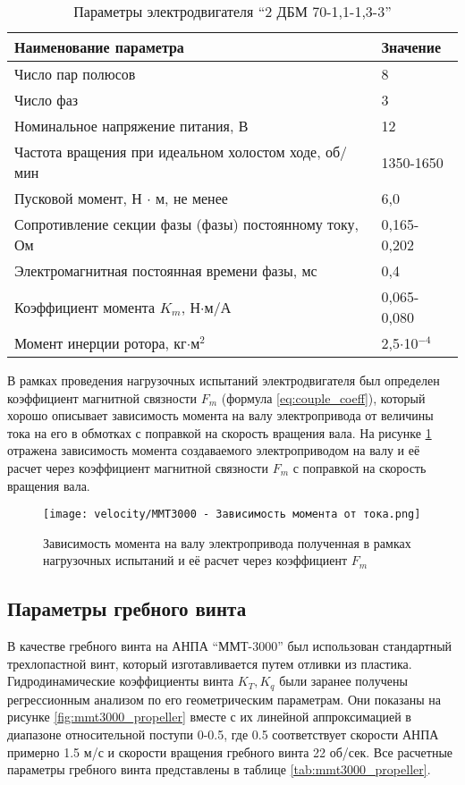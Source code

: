 \begin{table}
    \caption{Параметры электродвигателя ``2 ДБМ 70-1,1-1,3-3'' }\label{tab:mmt300_motor}
    \centering
    \begin{tabular}{ll}
        \toprule
        Наименование параметра  & Значение\\
        \midrule
        Число пар полюсов & 8 \\
        Число фаз & 3 \\
        Номинальное напряжение питания, В   & 12 \\
        Частота вращения при идеальном холостом ходе, об/мин & 1350-1650 \\
        Пусковой момент, Н $\cdot$ м, не менее      & 6,0 \\
        Сопротивление секции фазы (фазы) постоянному току, Ом & 0,165-0,202 \\
        Электромагнитная постоянная времени фазы, мс & 0,4 \\
        Коэффициент момента $K_m$, Н$\cdot$м/А   & 0,065-0,080   \\
        Момент инерции ротора, кг$\cdot$м$^2$   & 2,5$\cdot$10$^{-4}$ \\
        \bottomrule
    \end{tabular}
\end{table}

В рамках проведения нагрузочных испытаний электродвигателя был определен коэффициент магнитной связности $F_m$ (формула \ref{eq:couple_coeff}), который хорошо описывает зависимость момента на валу электропривода от величины тока на его в обмотках с поправкой на скорость вращения вала.
На рисунке \ref{fig:motor_torque} отражена зависимость момента создаваемого электроприводом на валу и её расчет через коэффициент магнитной связности $F_m$ с поправкой на скорость вращения вала.

\begin{figure}[ht]
    \centering
    \texttt{[image: velocity/MMT3000 - Зависимость момента от тока.png]}
    \caption{Зависимость момента на валу электропривода полученная в рамках нагрузочных испытаний и её расчет через коэффициент $F_m$}
    \label{fig:motor_torque}
\end{figure}

\subsection{Параметры гребного винта}
В качестве гребного винта на АНПА ``ММТ-3000'' был использован стандартный трехлопастной винт, который изготавливается путем отливки из пластика.
Гидродинамические коэффициенты винта $K_T, K_q$ были заранее получены регрессионным анализом по его геометрическим параметрам.
Они показаны на рисунке \ref{fig:mmt3000_propeller} вместе с их линейной аппроксимацией в диапазоне относительной поступи 0-0.5, где 0.5 соответствует скорости АНПА примерно 1.5 м/с и скорости вращения гребного винта 22 об/сек.
Все расчетные параметры гребного винта представлены в таблице \ref{tab:mmt3000_propeller}.

